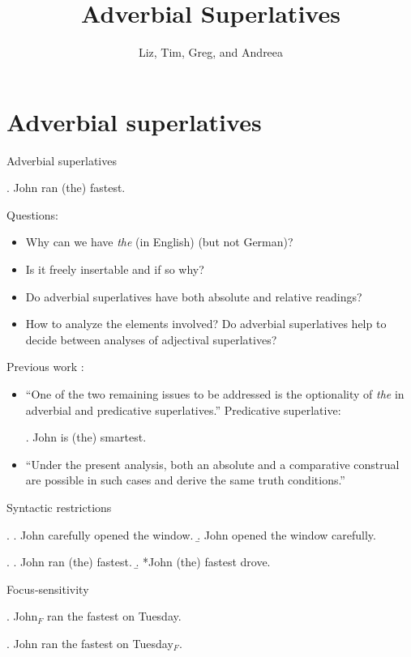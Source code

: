 \documentclass[xcolor=dvipsnames]{beamer}
\title{Adverbial Superlatives}
\author[Comparatives Group]{Liz, Tim, Greg, and Andreea}
\institute{SIASSI Summer Institute 2015}
\begin{document}
\frame{\titlepage}

\section{Adverbial superlatives}

\begin{frame}{Adverbial superlatives}

\ex. John ran (the) fastest.

Questions:
\begin{itemize}
\item Why can we have {\em the} (in English) (but not German)? 
\item Is it freely insertable and if so why?
\item Do adverbial superlatives have both absolute and relative
  readings?
\item How to analyze the elements involved? Do adverbial superlatives
  help to decide between analyses of adjectival superlatives?
\end{itemize}
\end{frame}

\begin{frame}{Previous work}
\citet{krasikova:2012}:

\begin{itemize}
\item ``One of the two remaining issues to be addressed is the
  optionality of {\em the} in adverbial and predicative
  superlatives.'' Predicative superlative:

\ex. John is (the) smartest.

\item ``Under the present analysis, both an absolute and a
  comparative construal are possible in such cases and derive the same
  truth conditions.''
\end{itemize}

\end{frame}


\begin{frame}{Syntactic restrictions}

\ex.
\a. John carefully opened the window.
\b. John opened the window carefully.

\ex.
\a. John ran (the) fastest.
\b. *John (the) fastest drove.

\end{frame}


\begin{frame}{Focus-sensitivity}


\ex. John$_F$ ran the fastest on Tuesday.

\ex. John ran the fastest on Tuesday$_F$.

\end{frame}
\end{document}
